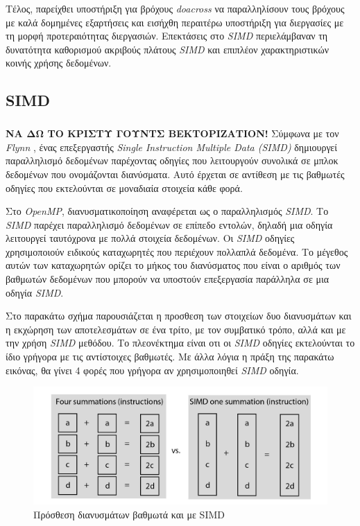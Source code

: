 \documentclass[12pt]{article}
\newcommand{\en}[1]{\foreignlanguage{english}{#1}}
\begin{document}
Τέλος, παρείχθει υποστήριξη για βρόχους \emph{\en{doacross}} να παραλληλίσουν τους βρόχους με καλά δομημένες εξαρτήσεις και εισήχθη περαιτέρω υποστήριξη για διεργασίες με τη μορφή προτεραιότητας διεργασιών.
Επεκτάσεις στο \emph{\en{SIMD}} περιελάμβαναν τη δυνατότητα καθορισμού ακριβούς πλάτους \emph{\en{SIMD}} και επιπλέον
χαρακτηριστικών κοινής χρήσης δεδομένων\cite{pros2}.
\clearpage

\subsection{\en{SIMD}}
\subparagraph{}

\textbf{ΝΑ ΔΩ ΤΟ ΚΡΙΣΤΥ ΓΟΥΝΤΣ ΒΕΚΤΟΡΙΖΑΤΙΟΝ!}
Σύμφωνα με τον \emph{\en{Flynn}} \cite{flynn}, ένας επεξεργαστής \emph{\en{Single Instruction Multiple Data (SIMD)}} δημιουργεί παραλληλισμό δεδομένων παρέχοντας οδηγίες που λειτουργούν συνολικά σε μπλοκ δεδομένων που ονομάζονται διανύσματα. Αυτό έρχεται σε αντίθεση με τις βαθμωτές οδηγίες που εκτελούνται σε μοναδιαία στοιχεία κάθε φορά.

Στο \emph{\en{OpenMP}}, διανυσματικοποίηση αναφέρεται ως ο παραλληλισμός \emph{\en{SIMD}}. Το \emph{\en{SIMD}} παρέχει παραλληλισμό δεδομένων σε επίπεδο εντολών, δηλαδή μια οδηγία λειτουργεί ταυτόχρονα με πολλά στοιχεία δεδομένων. Οι \emph{\en{SIMD}} οδηγίες χρησιμοποιούν ειδικούς καταχωρητές που περιέχουν πολλαπλά δεδομένα. Το μέγεθος αυτών των καταχωρητών ορίζει το μήκος του διανύσματος που είναι ο αριθμός των βαθμωτών δεδομένων που μπορούν να υποστούν επεξεργασία παράλληλα σε μια οδηγία \emph{\en{SIMD}}.

Στο παρακάτω σχήμα παρουσιάζεται η προσθεση των στοιχείων δυο διανυσμάτων και η εκχώρηση των αποτελεσμάτων σε ένα τρίτο, με τον συμβατικό τρόπο, αλλά και με την χρήση \emph{\en{SIMD}} μεθόδου. Το πλεονέκτημα είναι οτι οι \emph{\en{SIMD}} οδηγίες εκτελούνται το ίδιο γρήγορα με τις αντίστοιχες βαθμωτές. Με άλλα λόγια η πράξη της παρακάτω εικόνας, θα γίνει 4 φορές που γρήγορα αν χρησιμοποιηθεί \emph{\en{SIMD}} οδηγία.


\begin{figure}[h]
\includegraphics[width=\textwidth]{scalar_vs_simd}
\centering
\captionsetup{justification=centering, singlelinecheck=false}
	\caption{ Πρόσθεση διανυσμάτων βαθμωτά και με \en{SIMD}}
\label{fig:scalar_vs_simd}
\end{figure}
\clearpage
\end{document}
